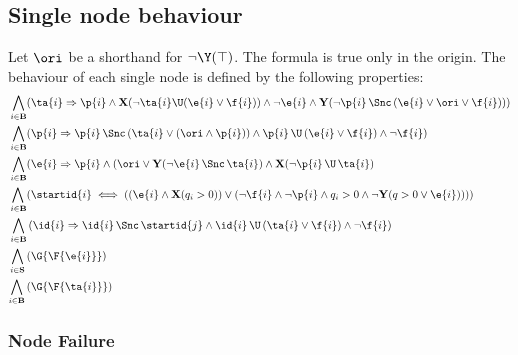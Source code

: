 
\subsection*{Single node behaviour}
Let $\ori$ be a shorthand for $\neg\Y(\top)$.
The formula is true only in the origin.
The behaviour of each single node is defined by the following properties:
\begin{align}
 \bigwedge_{
i \in \mathbf{B} } 
&(\ta{i} \Rightarrow 
\p{i} \wedge \mathbf{X}(\lnot \ta{i} \U (\e{i} \lor \f{i})) \land \lnot \e{i}
\land \mathbf{Y}(\lnot \p{i} \, \Snc \, (\e{i}\lor \ori \lor \f{i}))
) \label{eq:2a} \\
%
 \bigwedge_{
i \in \mathbf{B} } 
&(\p{i} \Rightarrow 
\p{i} \, \Snc \, ( \ta{i} \lor (\ori \land \p{i})) \land \p{i} \, \U \, (\e{i} \lor \f{i}) \land \lnot \f{i}) \label{eq:3a} \\
%
 \bigwedge_{
i \in \mathbf{B} } 
&(\e{i} \Rightarrow \p{i} 
\wedge (\ori \lor \mathbf{Y}(\lnot \e{i} \, \Snc \, \ta{i})
\land \mathbf{X}(\lnot \p{i} \, \U \, \ta{i})
 \label{eq:4a} \\
%
%
%
% 
\bigwedge_{
	\begin{subarray}{c}
	\,i \in \mathbf{B}
	\end{subarray}
}
&(\startid{i} \iff ( (\e{i} \land \mathbf{X}(q_i>0)) \lor (\lnot \f{i} \land \lnot \p{i} \land q_i>0 \land \lnot \mathbf{Y}(q>0 \lor \e{i}) ) ))\\
%
%
\bigwedge_{
	i \in \mathbf{B} } 
&\left( 
\id{i} \Rightarrow 
\id{i} \, \Snc \, \startid{j} \land 
\id{i} \, \U \, (\ta{i} \lor \f{i}) \land \lnot \f{i}
\right) \label{eq:5a} \\
%
%
\bigwedge_{
i \in \mathbf{S}} \,
&(\G{\F{\e{i}}})  \label{eq:6a}\\
%
%
 \bigwedge_{
\begin{subarray}{c}
i \in \mathbf{B}
\end{subarray}} \,
&(\G{\F{\ta{i}}})  \label{eq:7a}
%
\end{align}  


\subsubsection*{Node Failure}


